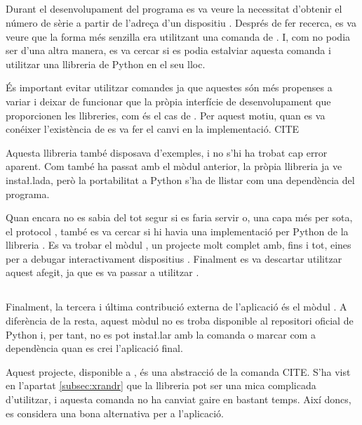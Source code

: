 \subsection{}

Durant el desenvolupament del programa es va veure la necessitat d'obtenir el
número de sèrie a partir de l'adreça d'un dispositiu . Després de fer
recerca, es va veure que la forma més senzilla era utilitzant una comanda
de . I, com no podia ser d'una altra manera, es va cercar si es podia
estalviar aquesta comanda i utilitzar una llibreria de Python en el seu lloc.

És important evitar utilitzar comandes ja que aquestes són més propenses a
variar i deixar de funcionar que la pròpia interfície de desenvolupament que
proporcionen les llibreries, com és el cas de . Per aquest motiu,
quan es va conéixer l'existència de  es va fer el canvi en la
implementació. CITE

Aquesta llibreria també disposava d'exemples, i no s'hi ha trobat cap
error aparent. Com també ha passat amb el mòdul anterior, la pròpia llibreria
ja ve insta\l.lada, però la portabilitat a Python s'ha de llistar com una
dependència del programa.

Quan encara no es sabia del tot segur si es faria servir  o, una capa
més per sota, el protocol , també es va cercar si hi havia una
implementació per Python de la llibreria . Es va trobar el mòdul
, un projecte molt complet amb, fins i tot, eines per a debugar
interactivament dispositius . Finalment es va descartar utilitzar
aquest afegit, ja que es va passar a utilitzar .

\subsection{}
\label{subsec:pyxrandr}

Finalment, la tercera i última contribució externa de l'aplicació és el
mòdul . A diferència de la resta, aquest mòdul no es troba
disponible al repositori oficial de Python  i, per tant, no es pot
insta\l.lar amb la comanda  o marcar com a dependència quan es crei
l'aplicació final.

Aquest projecte, disponible a , és una abstracció de la comanda
 CITE. S'ha vist en l'apartat \ref{subsec:xrandr} que la llibreria
 pot ser una mica complicada d'utilitzar, i aquesta comanda no ha
canviat gaire en bastant temps. Així doncs, es considera una bona alternativa
per a l'aplicació.

